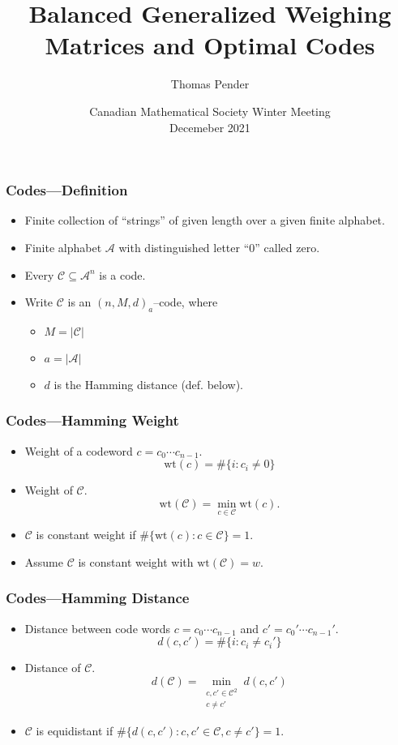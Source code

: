 \documentclass{beamer}
\title[BGWs and Codes]{Balanced Generalized Weighing Matrices and Optimal Codes}
\author[T. Pender]{Thomas Pender}
\institute[U of L]{University of Lethbridge\\Department of Mathematics and Computer Science}
\date[CMS Dec 2021]{Canadian Mathematical Society Winter Meeting\\Decemeber 2021}
\newcommand{\A}{\mathcal{A}}
\newcommand{\C}{\mathscr{C}}
\newcommand{\wt}{\mathrm{wt}}
\begin{document}
\begin{frame}
 \titlepage
\end{frame}

\begin{frame}
 \frametitle{Codes---Definition}
 \begin{itemize}
  \item Finite collection of ``strings'' of given length over a given finite alphabet.
  \item Finite alphabet $\A$ with distinguished letter ``0'' called zero.
  \item Every $\C \subseteq \A^n$ is a code.
  \item Write $\C$ is an $(n,M,d)_a$--code, where
  \begin{itemize}
  \item $M = |\C|$
  \item $a = |\A|$
  \item $d$ is the Hamming distance (def. below).
  \end{itemize}
 \end{itemize}
\end{frame}

\begin{frame}
 \frametitle{Codes---Hamming Weight}
 \begin{itemize}
  \item Weight of a codeword $c=c_0 \cdots c_{n-1}$.
  $$
  \wt(c) = \#\{i : c_i \neq 0\}
  $$
  \item Weight of $\C$.
  $$
  \wt(\C) = \min_{c \in \C}\wt(c).
  $$
  \item $\C$ is constant weight if $\#\{\wt(c) : c \in \C\} = 1$.
  \item Assume $\C$ is constant weight with $\wt(\C)=w$.
 \end{itemize}
\end{frame}

\begin{frame}
 \frametitle{Codes---Hamming Distance}
 \begin{itemize}
  \item Distance between code words $c=c_0 \cdots c_{n-1}$ and $c'=c_0' \cdots c_{n-1}'$.
  $$
  d(c,c') = \#\{i : c_i \neq c_i'\}
  $$
  \item Distance of $\C$.
  $$
  d(\C) = \min_{\begin{smallmatrix}c,c' \in \C^2 \\ c \neq c'\end{smallmatrix}} d(c,c')
  $$
  \item $\C$ is equidistant if $\#\{d(c,c') : c,c' \in \C, c \neq c'\} = 1$.
 \end{itemize}
\end{frame}
\end{document}
